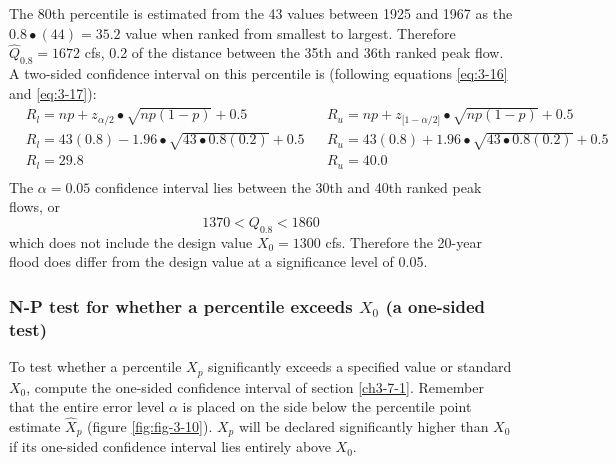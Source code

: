 \documentclass[]{book}
\begin{document}
The 80th percentile is estimated from the 43 values between 1925 and 1967 as the \(0.8 \bullet (44) = 35.2\) value when ranked from smallest to largest. Therefore \(\hat{Q}_{0.8} = 1672\) cfs, 0.2 of the distance between the 35th and 36th ranked peak flow. A two-sided confidence interval on this percentile is (following equations \eqref{eq:3-16} and \eqref{eq:3-17}):
\begin{equation}
\begin{aligned}
&R_{l} = np + z_{\alpha / 2} \bullet \sqrt{np(1 - p)} + 0.5 &&R_{u} = np + z_{\lbrack 1 - \alpha / 2 \rbrack} \bullet \sqrt{np(1 - p)} + 0.5 \\
&R_{l} = 43(0.8) - 1.96 \bullet \sqrt{43 \bullet 0.8 (0.2)} + 0.5 &&R_{u} = 43(0.8) + 1.96 \bullet \sqrt{43 \bullet 0.8 (0.2)} + 0.5 \\
&R_{l} = 29.8 &&R_{u} = 40.0\\
\end{aligned}
\end{equation}
The \(\alpha = 0.05\) confidence interval lies between the 30th and 40th ranked peak flows, or \[1370 < Q_{0.8} < 1860\] which does not include the design value \(X_{0} = 1300\) cfs. Therefore the 20-year flood does differ from the design value at a significance level of 0.05.

\hypertarget{n-p-test-for-whether-a-percentile-exceeds-x_0-a-one-sided-test}{%
\subsubsection{\texorpdfstring{N-P test for whether a percentile exceeds \(X_{0}\) (a one-sided test)}{N-P test for whether a percentile exceeds X\_\{0\} (a one-sided test)}}\label{n-p-test-for-whether-a-percentile-exceeds-x_0-a-one-sided-test}}

To test whether a percentile \(X_{p}\) significantly exceeds a specified value or standard \(X_{0}\), compute the one-sided confidence interval of section \ref{ch3-7-1}. Remember that the entire error level \(\alpha\) is placed on the side below the percentile point estimate \(\hat{X}_{p}\) (figure \ref{fig:fig-3-10}). \(X_{p}\) will be declared significantly higher than \(X_{0}\) if its one-sided confidence interval lies entirely above \(X_{0}\).
\end{document}

